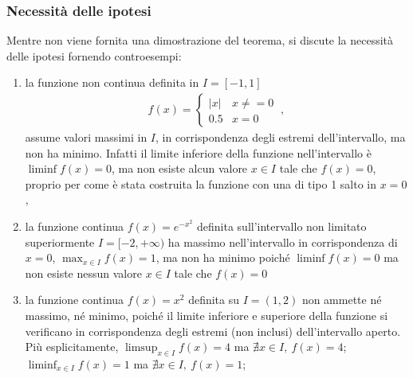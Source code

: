 \documentclass[letterpaper,10pt,italian]{jupyterBook}
\begin{document}
\subsubsection*{Necessità delle ipotesi}

\sphinxAtStartPar
Mentre non viene fornita una dimostrazione del teorema, si discute la necessità delle ipotesi fornendo controesempi:
\begin{enumerate}
%
\item {} 
\sphinxAtStartPar
la funzione non continua definita in \(I = [-1,1]\)
\begin{equation*}
\begin{split}f(x) = \begin{cases} |x| & x \ne = 0 \\ 0.5 & x = 0 \end{cases} \ ,\end{split}
\end{equation*}
\sphinxAtStartPar
assume valori massimi in \(I\), in corrispondenza degli estremi dell’intervallo, ma non ha minimo. Infatti il limite inferiore della funzione nell’intervallo è \(\liminf f(x) = 0\), ma non esiste alcun valore \(x \in I\) tale che \(f(x) = 0\), proprio per come è stata costruita la funzione con una {\hyperref[\detokenize{ch/infinitesimal_calculus/analysis:infinitesimal-calculus-continuous-fun-disc}]{}} di tipo 1 \sphinxhyphen{} salto in \(x = 0\),

\item {} 
\sphinxAtStartPar
la funzione continua \(f(x) = e^{-x^2}\) definita sull’intervallo non limitato superiormente \(I = [-2, +\infty)\) ha massimo nell’intervallo in corrispondenza di \(x = 0\), \(\max_{x \in I} f(x) = 1\), ma non ha minimo poiché \(\liminf f(x) = 0\) ma non esiste nessun valore \(x \in I\) tale che \(f(x) = 0\)

\item {} 
\sphinxAtStartPar
la funzione continua \(f(x) = x^2\) definita su \(I = (1,2)\) non ammette né massimo, né minimo, poiché il limite inferiore e superiore della funzione si verificano in corrispondenza degli estremi (non inclusi) dell’intervallo aperto. Più esplicitamente, \(\limsup_{x\in I} f(x) = 4\) ma \(\nexists x \in I, \ f(x) = 4\); \(\liminf_{x\in I} f(x) = 1\) ma \(\nexists x \in I, \ f(x) = 1\);

\end{enumerate}
\end{document}
